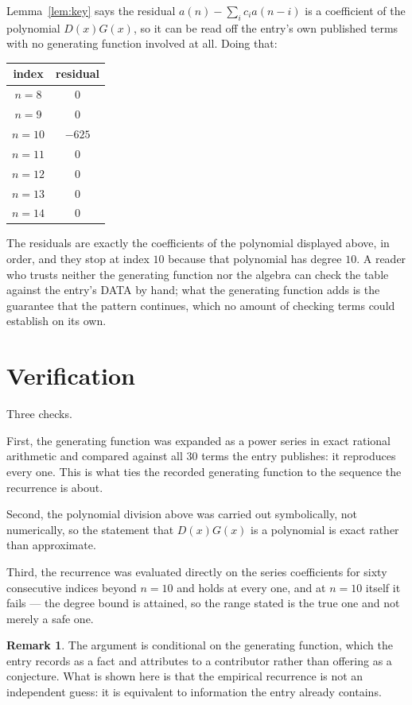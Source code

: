\documentclass[11pt,a4paper]{article}
\theoremstyle{plain}
\theoremstyle{definition}
\newtheorem{remark}[theorem]{Remark}
\begin{document}
Lemma~\ref{lem:key} says the residual $a(n)-\sum_ic_ia(n-i)$ is a coefficient of the
polynomial $D(x)G(x)$, so it can be read off the entry's own published terms with no
generating function involved at all. Doing that:
\begin{center}
\begin{tabular}{cc}
index & residual \\ \hline
$n=8$ & $0$ \\
$n=9$ & $0$ \\
$n=10$ & $-625$ \\
$n=11$ & $0$ \\
$n=12$ & $0$ \\
$n=13$ & $0$ \\
$n=14$ & $0$
\end{tabular}
\end{center}
The residuals are exactly the coefficients of the polynomial displayed above, in order, and
they stop at index $10$ because that polynomial has degree $10$. A reader who trusts
neither the generating function nor the algebra can check the table against the entry's DATA
by hand; what the generating function adds is the guarantee that the pattern continues, which
no amount of checking terms could establish on its own.

\section{Verification}

Three checks.

First, the generating function was expanded as a power series in exact rational arithmetic and
compared against all $30$ terms the entry publishes: it reproduces every one. This is
what ties the recorded generating function to the sequence the recurrence is about.

Second, the polynomial division above was carried out symbolically, not numerically, so the
statement that $D(x)G(x)$ is a polynomial is exact rather than approximate.

Third, the recurrence was evaluated directly on the series coefficients for sixty consecutive
indices beyond $n=10$ and holds at every one, and at $n=10$ itself it fails --- the
degree bound is attained, so the range stated is the true one and not merely a safe one.

\begin{remark}
The argument is conditional on the generating function, which the entry records as a fact and
attributes to a contributor rather than offering as a conjecture. What is shown here is that
the empirical recurrence is not an independent guess: it is equivalent to information the
entry already contains.
\end{remark}
\end{document}
